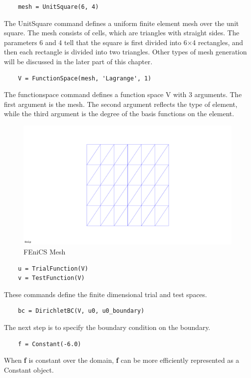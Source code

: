 \begin{lstlisting}
	mesh = UnitSquare(6, 4)
\end{lstlisting}
The UnitSquare command defines a uniform finite element mesh over the unit square. The mesh consists of cells, which are triangles with straight sides. The parameters 6 and 4 tell that the square is first divided into 6×4 rectangles, and then each rectangle is divided into two triangles.
Other types of mesh generation will be discussed in the later part of this chapter.
\begin{lstlisting}
	V = FunctionSpace(mesh, 'Lagrange', 1)
\end{lstlisting}
The functionspace command defines a function space V with 3 arguments. The first argument is the mesh. The second argument reflects the type of element, while the third argument is the degree of the basis functions on the element.

\begin{figure}[h]
	\center
	\includegraphics[scale = 0.25]{images/mesh.png}
	\caption{FEniCS Mesh}
\end{figure}

\begin{lstlisting}
	u = TrialFunction(V)
	v = TestFunction(V)
\end{lstlisting}
These commands define the finite dimensional trial and test spaces.
\begin{lstlisting}
	bc = DirichletBC(V, u0, u0_boundary)
\end{lstlisting}
The next step is to specify the boundary condition on the boundary.
\begin{lstlisting}
	f = Constant(-6.0)
\end{lstlisting}
When \textbf{f} is constant over the domain, \textbf{f} can be more efficiently represented as a Constant object.

